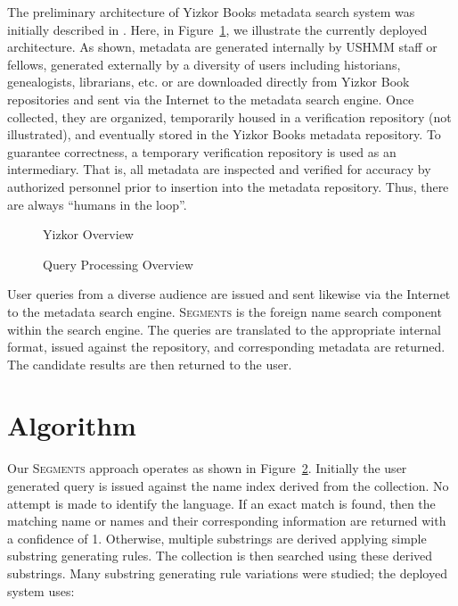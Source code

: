 \documentclass{endm}
\begin{document}
\begin{CJK}{UTF8}{song}
The preliminary architecture of Yizkor Books metadata search system was initially described in \cite{soo:yizkor}.  Here, in Figure~\ref{fig:yizkor_overview}, we illustrate the currently deployed architecture.  As shown, metadata are generated internally by USHMM staff or fellows, generated externally by a diversity of users including historians, genealogists, librarians, etc. or are downloaded directly from Yizkor Book repositories and sent via the Internet to the metadata search engine.  Once collected, they are organized, temporarily housed in a verification repository (not illustrated), and eventually stored in the Yizkor Books metadata repository.  To guarantee correctness, a temporary verification repository is used as an intermediary.  That is, all metadata are inspected and verified for accuracy by authorized personnel prior to insertion into the metadata repository.  Thus, there are always ``humans in the loop''.

\begin{figure}
\centering
\caption{Yizkor Overview}
\label{fig:yizkor_overview}
\end{figure}

\begin{figure}
\centering
{}
\caption{Query Processing Overview}
\label{fig:segments_overview}
\end{figure}


User queries from a diverse audience are issued and sent likewise via the Internet to the metadata search engine.  S\textsc{egments} is the foreign name search component within the search engine.  The queries are translated to the appropriate internal format, issued against the repository, and corresponding metadata are returned.  The candidate results are then returned to the user.


\section{Algorithm} %
\label{sec:algorithm}
Our S\textsc{egments} approach operates as shown in Figure~\ref{fig:segments_overview}.  Initially the user generated query is issued against the name index derived from the collection.  No attempt is made to identify the language.  If an exact match is found, then the matching name or names and their corresponding information are returned with a confidence of 1.  Otherwise, multiple substrings are derived applying simple substring generating rules.  The collection is then searched using these derived substrings.  Many substring generating rule variations were studied; the deployed system uses:


\end{CJK}
\end{document}

